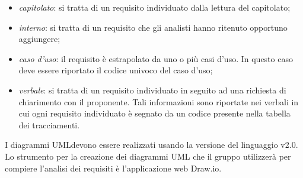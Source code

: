 \begin{itemize}
\begin{itemize}
					\item \textit{capitolato\glo}: si tratta di un requisito individuato dalla lettura del capitolato;
					\item \textit{interno}: si tratta di un requisito che gli analisti hanno ritenuto opportuno aggiungere;
					\item \textit{caso d'uso}: il requisito è estrapolato da uno o più casi d'uso. In questo caso deve essere riportato il codice univoco del caso d'uso;
					\item \textit{verbale}: si tratta di un requisito individuato in seguito ad una richiesta di chiarimento con il proponente. Tali informazioni sono riportate nei verbali in cui ogni requisito individuato è segnato da un codice presente nella tabella dei tracciamenti. \\
				\end{itemize}
			\end{itemize}

			 \newline \newline
			I diagrammi UML\glosp devono essere realizzati usando la versione del linguaggio v2.0. Lo strumento per la creazione dei diagrammi UML che il gruppo utilizzerà per compiere l'analisi dei requisiti è l'applicazione web Draw.io. 

